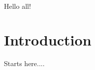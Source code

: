 \documentclass{article}
\begin{document}
Hello all!

\section{Introduction}

Starts here....
\end{document}
